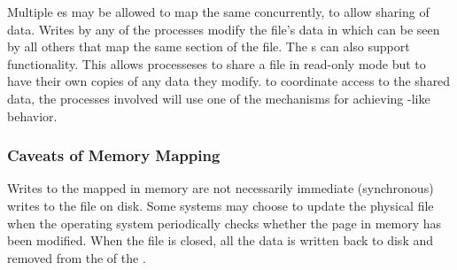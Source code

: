 Multiple es may be allowed to map the same  concurrently, to allow sharing of data.
Writes by any of the processes modify the file's data in  which can be seen by all others that map the same section of the file.
The  s can also support  functionality.
This allows processeses to share a file in read-only mode but to have their own copies of any data they modify.
to coordinate access to the shared data, the processes involved will use one of the mechanisms for achieving -like behavior.

\subsubsection{Caveats of Memory Mapping}\label{subsubsec:Memory_Mapping_Caveats}
Writes to the  mapped in memory are not necessarily immediate (synchronous) writes to the file on disk.
Some systems may choose to update the physical file when the operating system periodically checks whether the page in memory has been modified.
When the file is closed, all the data is written back to disk and removed from the  of the .


